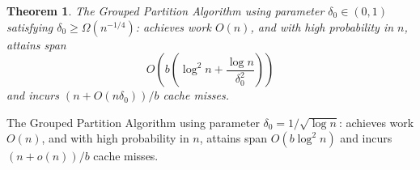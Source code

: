 \documentclass[twocolumn, twoside, 11pt]{article}
\newtheorem{theorem}{Theorem}
\begin{document}
\begin{theorem}
	\label{thm:groupedPartitionAlg}
	The Grouped Partition Algorithm using parameter $\delta_0\in(0,1)$ satisfying $\delta_0 \ge \Omega(n^{-1/4})$: achieves work $O(n)$, and with high probability in $n$, attains span 
	$$O\left(b\left(\log^2 n + \frac{\log n}{\delta_0^2}\right)\right)$$
	and incurs $(n+O(n \delta_0))/b$ cache misses. 
\end{theorem}

\begin{corollary}
	\label{cor:groupedPartitionAlg}
	The Grouped Partition Algorithm using parameter $\delta_0=1/\sqrt{\log n}$:
	achieves work $O(n)$, and with high probability in $n$, attains span $O(b\log^2 n)$ and incurs $(n+o(n))/b$ cache misses. 
\end{corollary}
\end{document}
